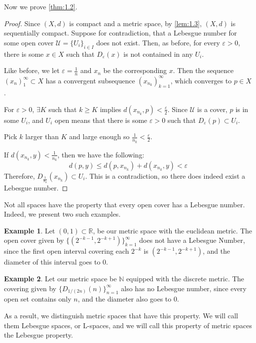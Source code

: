 \documentclass[openany, amssymb, psamsfonts]{amsart}
\let\fullref\autoref
\theoremstyle{definition}
\newtheorem{exmp}{Example}[section]
\numberwithin{equation}{section}
\begin{document}
Now we prove \fullref{thm:1.2}.
\begin{proof}[Proof]
  Since $(X,d)$ is compact and a metric space, by \fullref{lem:1.3}, $(X,d)$ is sequentially compact. Suppose for contradiction, that a Lebesgue number for some open cover $\mathcal{U} = \{U_i\}_{i\in I}$ does not exist. Then, as before, for every $\varepsilon > 0$, there is some $x \in X$ such that $D_\varepsilon(x)$ is not contained in any $U_i$. 

  Like before, we let $\varepsilon = \frac1{n}$ and $x_n$ be the corresponding $x$. Then the sequence $(x_n)_1^\infty \subset X$ has a convergent subsequence $(x_{n_k})_{k=1}^\infty$, which converges to $p \in X$. 

  For $\varepsilon > 0$, $\exists K$ such that $k\ge K$ implies $d(x_{n_k}, p) < \frac{\varepsilon}{2}$. Since $\mathcal{U}$ is a cover, $p$ is in some $U_i$, and $U_i$ open means that there is some $\varepsilon > 0$ such that $D_\varepsilon(p) \subset U_i$. 

  Pick $k$ larger than $K$ and large enough so $\frac{1}{n_k} < \frac{\varepsilon}{2}$. 

  If $d(x_{n_k}, y) < \frac{1}{n_k}$, then we have the following:
  \begin{equation*}
    d(p,y) \le d(p,x_{n_k}) + d(x_{n_k}, y) < \varepsilon
  \end{equation*}
  Therefore, $D_{\frac{1}{n_k}}(x_{n_k}) \subset U_i$. This is a contradiction, so there does indeed exist a Lebesgue number.
\end{proof}

Not all spaces have the property that every open cover has a Lebesgue number. Indeed, we present two such examples. 

\begin{exmp}
  Let $(0,1) \subset \mathbb R$, be our metric space with the euclidean metric. The open cover given by $\{(2^{-k-1}, 2^{-k+1})\}_{k=1}^\infty$ does not have a Lebesgue Number, since the first open interval covering each $2^{-k}$ is $(2^{-k-1}, 2^{-k+1})$, and the diameter of this interval goes to $0$.
\end{exmp} 
\begin{exmp}\label{exmp:1.8}
  Let our metric space be $\mathbb N$ equipped with the discrete metric. The covering given by $\{D_{1/(2n)}(n)\}_{n=1}^\infty$ also has no Lebesgue number, since every open set contains only $n$, and the diameter also goes to $0$. 
\end{exmp}
As a result, we distinguish metric spaces that have this property. We will call them Lebesgue spaces, or L-spaces, and we will call this property of metric spaces the Lebesgue property. 
\end{document}
